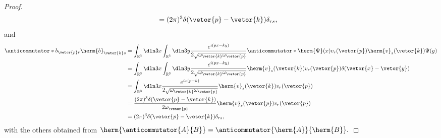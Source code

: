 \begin{proof}
\begin{align*}
      &= (2\pi)^3 \delta(\vetor{p} - \vetor{k}) \delta_{rs},
   \end{align*}
   and
   \begin{align*}
      \anticommutator*{b_{\vetor{p}r}}{\herm{b}_{\vetor{k}s}} 
      &= \int_{\mathbb{R}^3} \dln3x \int_{\mathbb{R}^3} \dln3y \frac{e^{i(px - ky)}}{2\sqrt{\omega_{\vetor{k}} \omega_{\vetor{p}}}} \anticommutator*{\herm{\Psi}(x)v_r(\vetor{p})}{\herm{v}_s(\vetor{k}) \Psi(y)}\\
      &= \int_{\mathbb{R}^3} \dln3x \int_{\mathbb{R}^3} \dln3y \frac{e^{i(px - ky)}}{2\sqrt{\omega_{\vetor{k}} \omega_{\vetor{p}}}} \herm{v}_s(\vetor{k}) v_r(\vetor{p}) \delta(\vetor{x} - \vetor{y})\\
      &= \int_{\mathbb{R}^3} \dln3x \frac{e^{ix(p - k)}}{2\sqrt{\omega_{\vetor{k}} \omega_{\vetor{p}}}} \herm{v}_s(\vetor{k}) v_r(\vetor{p})\\
      &= \frac{(2\pi)^3 \delta(\vetor{p} - \vetor{k})}{2 \omega_{\vetor{p}}} \herm{v}_s(\vetor{p}) v_r(\vetor{p})\\
      &= (2\pi)^3 \delta(\vetor{p} - \vetor{k}) \delta_{rs},
   \end{align*}
   with the others obtained from \(\herm{\anticommutator{A}{B}} = \anticommutator{\herm{A}}{\herm{B}}.\)


\end{proof}
